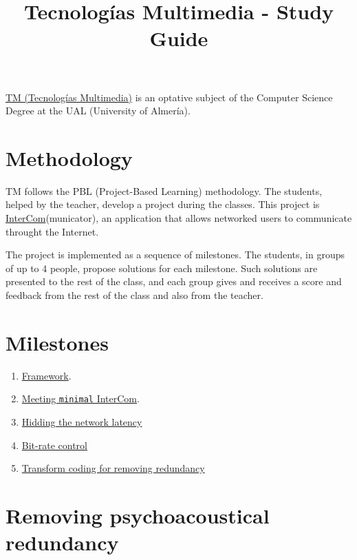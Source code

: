 \title{Tecnologías Multimedia - Study Guide}

\maketitle

\href{https://www.ual.es/estudios/grados/presentacion/plandeestudios/asignatura/4015/40154321}{TM
  (Tecnologías Multimedia)} is an optative subject of the Computer
Science Degree at the UAL (University of Almería).

\section{Methodology}
TM follows the PBL (Project-Based Learning) methodology. The students,
helped by the teacher, develop a project during the classes. This
project
is \href{https://github.com/Tecnologias-multimedia/intercom}{InterCom}(municator),
an application that allows networked users to communicate throught
the Internet.

The project is implemented as a sequence of milestones. The students,
in groups of up to 4 people, propose solutions for each
milestone. Such solutions are presented to the rest of the class, and
each group gives and receives a score and feedback from the rest of
the class and also from the teacher.

\section{Milestones}

\begin{enumerate}
\item \href{https://tecnologias-multimedia.github.io/study_guide/framework/}{Framework}.
\item \href{https://tecnologias-multimedia.github.io/study_guide/minimal/}{Meeting \texttt{minimal} InterCom}.
\item \href{https://tecnologias-multimedia.github.io/study_guide/latency/}{Hidding the network latency}
\item \href{https://tecnologias-multimedia.github.io/study_guide/BR_control/}{Bit-rate control}
\item \href{https://tecnologias-multimedia.github.io/study_guide/transform_coding/}{Transform coding for removing redundancy}
\end{enumerate}

\section{Removing psychoacoustical redundancy}

